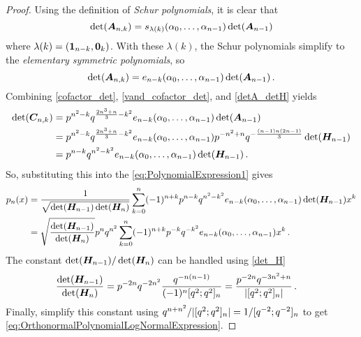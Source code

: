 \begin{subappendices}
\begin{proof}
Using the definition of \emph{Schur polynomials}, it is clear that
\[ \det(\bm{A}_{n,k})  = s_{\lambda(k)}(\alpha_0,\dots,\alpha_{n-1}) \det(\bm{A}_{n-1}) \]
where $\lambda(k) = (\bm{1}_{n-k}, \bm{0}_{k})$. With these $\lambda(k)$, the Schur polynomials simplify to the \emph{elementary symmetric polynomials}, so
\begin{equation} \label{vand_cofactor_det}
\det(\bm{A}_{n,k}) = e_{n-k}(\alpha_0,\dots,\alpha_{n-1}) \det(\bm{A}_{n-1}) \,.
\end{equation}
Combining \eqref{cofactor_det}, \eqref{vand_cofactor_det}, and \eqref{detA_detH} yields
\begin{align*}
\det(\bm{C}_{n,k})
&= p^{n^{2}-k}q^{\frac{2n^{3}+n}{3}-k^{2}} e_{n-k}(\alpha_0,\dots,\alpha_{n-1}) \det(\bm{A}_{n-1}) \\
&=  p^{n^{2}-k}q^{\frac{2n^{3}+n}{3}-k^{2}} e_{n-k}(\alpha_0,\dots,\alpha_{n-1}) p^{-n^2+n} q^{-\frac{(n-1)n(2n-1)}{3}} \det(\bm{H}_{n-1}) \\
&= p^{n-k} q^{n^2-k^2} e_{n-k}(\alpha_0,\dots,\alpha_{n-1}) \det(\bm{H}_{n-1}) \,.
\end{align*}
So, substituting this into the \eqref{eq:PolynomialExpression1} gives
\begin{align*}
p_{n}(x)
&=\frac{1}{\sqrt{\det(\bm{H}_{n-1})\det(\bm{H}_n)}}\sum_{k=0}^{n}(-1)^{n+k} p^{n-k} q^{n^2-k^2} e_{n-k}(\alpha_0,\dots,\alpha_{n-1}) \det(\bm{H}_{n-1}) x^{k} \\
&=  \sqrt{ \frac{ \det(\bm{H}_{n-1}) }{ \det(\bm{H}_n) } } p^{n} q^{n^2} \sum_{k=0}^{n}(-1)^{n+k} p^{-k} q^{-k^2} e_{n-k}(\alpha_0,\dots,\alpha_{n-1})  x^{k} \,.
\end{align*}
The constant $\det(\bm{H}_{n-1}) / \det(\bm{H}_n)$ can be handled using \eqref{det_H}
\begin{align*}
\frac{\det(\bm{H}_{n-1})}{\det(\bm{H}_n)}
&= p^{-2n} q^{-2n^2} \frac{ q^{-n(n-1)} }{ (-1)^n [q^2; q^2]_n  } =  \frac{ p^{-2n} q^{-3n^2+n} }{\lvert  [q^2; q^2]_n \rvert } \,.
\end{align*}
Finally, simplify this constant using $q^{n + n^2}/ \lvert  [q^2; q^2]_n \rvert = 1/[q^{-2}; q^{-2}]_n$ to get \eqref{eq:OrthonormalPolynomialLogNormalExpression}.
\end{proof}


\end{subappendices}
